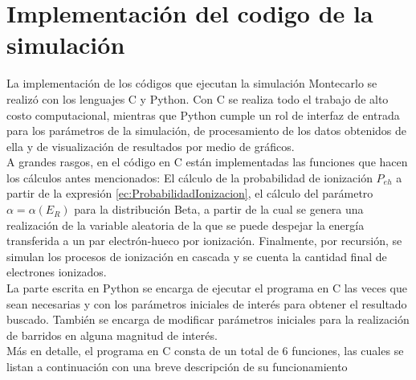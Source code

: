 \appendix
\chapter{Implementación del codigo de la simulación}
\noindent La implementación de los códigos que ejecutan la simulación Montecarlo se realizó con los lenguajes C y Python. Con C se realiza todo el trabajo de alto costo computacional, mientras que Python cumple un rol de interfaz de entrada para los parámetros de la simulación, de procesamiento de los datos obtenidos de ella y de visualización de resultados por medio de gráficos.\\
\indent A grandes rasgos, en el código en C están implementadas las funciones que hacen los cálculos antes mencionados: El cálculo de la probabilidad de ionización $P_{eh}$ a partir de la expresión \eqref{ec:ProbabilidadIonizacion}, el cálculo del parámetro $\alpha = \alpha(E_{R})$ para la distribución Beta, a partir de la cual se genera una realización de la variable aleatoria de la que se puede despejar la energía transferida a un par electrón-hueco por ionización. Finalmente, por recursión, se simulan los procesos de ionización en cascada y se cuenta la cantidad final de electrones ionizados.\\
\indent La parte escrita en Python se encarga de ejecutar el programa en C las veces que sean necesarias y con los parámetros iniciales de interés para obtener el resultado buscado. También se encarga de modificar parámetros iniciales para la realización de barridos en alguna magnitud de interés.\\
\indent Más en detalle, el programa en C consta de un total de $6$ funciones, las cuales se listan a continuación con una breve descripción de su funcionamiento
